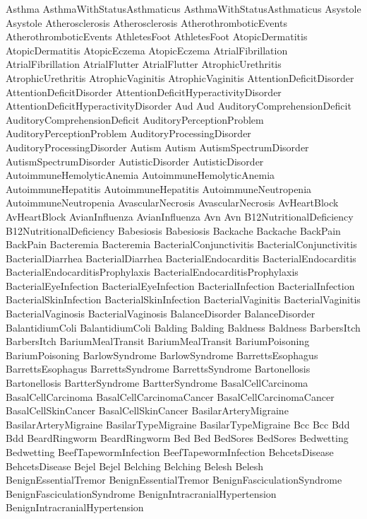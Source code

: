  Asthma
 AsthmaWithStatusAsthmaticus
 AsthmaWithStatusAsthmaticus
 Asystole
 Asystole
 Atherosclerosis
 Atherosclerosis
 AtherothromboticEvents
 AtherothromboticEvents
 AthletesFoot
 AthletesFoot
 AtopicDermatitis
 AtopicDermatitis
 AtopicEczema
 AtopicEczema
 AtrialFibrillation
 AtrialFibrillation
 AtrialFlutter
 AtrialFlutter
 AtrophicUrethritis
 AtrophicUrethritis
 AtrophicVaginitis
 AtrophicVaginitis
 AttentionDeficitDisorder
 AttentionDeficitDisorder
 AttentionDeficitHyperactivityDisorder
 AttentionDeficitHyperactivityDisorder
 Aud
 Aud
 AuditoryComprehensionDeficit
 AuditoryComprehensionDeficit
 AuditoryPerceptionProblem
 AuditoryPerceptionProblem
 AuditoryProcessingDisorder
 AuditoryProcessingDisorder
 Autism
 Autism
 AutismSpectrumDisorder
 AutismSpectrumDisorder
 AutisticDisorder
 AutisticDisorder
 AutoimmuneHemolyticAnemia
 AutoimmuneHemolyticAnemia
 AutoimmuneHepatitis
 AutoimmuneHepatitis
 AutoimmuneNeutropenia
 AutoimmuneNeutropenia
 AvascularNecrosis
 AvascularNecrosis
 AvHeartBlock
 AvHeartBlock
 AvianInfluenza
 AvianInfluenza
 Avn
 Avn
 B12NutritionalDeficiency
 B12NutritionalDeficiency
 Babesiosis
 Babesiosis
 Backache
 Backache
 BackPain
 BackPain
 Bacteremia
 Bacteremia
 BacterialConjunctivitis
 BacterialConjunctivitis
 BacterialDiarrhea
 BacterialDiarrhea
 BacterialEndocarditis
 BacterialEndocarditis
 BacterialEndocarditisProphylaxis
 BacterialEndocarditisProphylaxis
 BacterialEyeInfection
 BacterialEyeInfection
 BacterialInfection
 BacterialInfection
 BacterialSkinInfection
 BacterialSkinInfection
 BacterialVaginitis
 BacterialVaginitis
 BacterialVaginosis
 BacterialVaginosis
 BalanceDisorder
 BalanceDisorder
 BalantidiumColi
 BalantidiumColi
 Balding
 Balding
 Baldness
 Baldness
 BarbersItch
 BarbersItch
 BariumMealTransit
 BariumMealTransit
 BariumPoisoning
 BariumPoisoning
 BarlowSyndrome
 BarlowSyndrome
 BarrettsEsophagus
 BarrettsEsophagus
 BarrettsSyndrome
 BarrettsSyndrome
 Bartonellosis
 Bartonellosis
 BartterSyndrome
 BartterSyndrome
 BasalCellCarcinoma
 BasalCellCarcinoma
 BasalCellCarcinomaCancer
 BasalCellCarcinomaCancer
 BasalCellSkinCancer
 BasalCellSkinCancer
 BasilarArteryMigraine
 BasilarArteryMigraine
 BasilarTypeMigraine
 BasilarTypeMigraine
 Bcc
 Bcc
 Bdd
 Bdd
 BeardRingworm
 BeardRingworm
 Bed
 Bed
 BedSores
 BedSores
 Bedwetting
 Bedwetting
 BeefTapewormInfection
 BeefTapewormInfection
 BehcetsDisease
 BehcetsDisease
 Bejel
 Bejel
 Belching
 Belching
 Belesh
 Belesh
 BenignEssentialTremor
 BenignEssentialTremor
 BenignFasciculationSyndrome
 BenignFasciculationSyndrome
 BenignIntracranialHypertension
 BenignIntracranialHypertension
